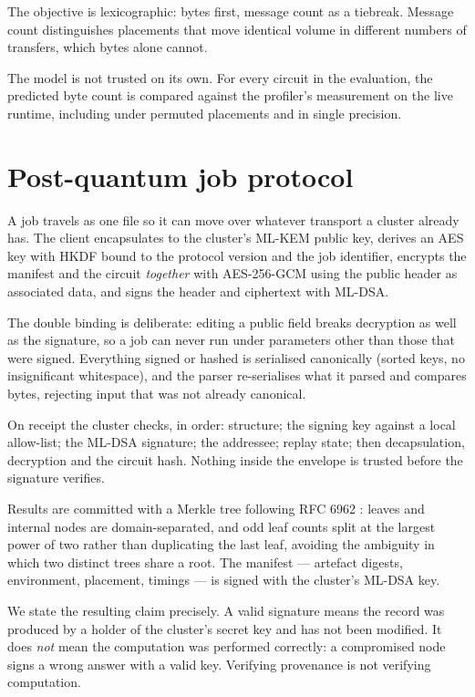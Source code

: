 \documentclass[11pt]{article}
\begin{document}
The objective is lexicographic: bytes first, message count as a tiebreak.
Message count distinguishes placements that move identical volume in different
numbers of transfers, which bytes alone cannot.

The model is not trusted on its own. For every circuit in the evaluation, the
predicted byte count is compared against the profiler's measurement on the live
runtime, including under permuted placements and in single precision.

\section{Post-quantum job protocol}

A job travels as one file so it can move over whatever transport a cluster
already has. The client encapsulates to the cluster's ML-KEM public key,
derives an AES key with HKDF bound to the protocol version and the job
identifier, encrypts the manifest and the circuit \emph{together} with
AES-256-GCM using the public header as associated data, and signs the header
and ciphertext with ML-DSA.

The double binding is deliberate: editing a public field breaks decryption as
well as the signature, so a job can never run under parameters other than those
that were signed. Everything signed or hashed is serialised canonically
(sorted keys, no insignificant whitespace), and the parser re-serialises what it
parsed and compares bytes, rejecting input that was not already canonical.

On receipt the cluster checks, in order: structure; the signing key against a
local allow-list; the ML-DSA signature; the addressee; replay state; then
decapsulation, decryption and the circuit hash. Nothing inside the envelope is
trusted before the signature verifies.

Results are committed with a Merkle tree following RFC 6962 \cite{rfc6962}:
leaves and internal nodes are domain-separated, and odd leaf counts split at the
largest power of two rather than duplicating the last leaf, avoiding the
ambiguity in which two distinct trees share a root. The manifest --- artefact
digests, environment, placement, timings --- is signed with the cluster's
ML-DSA key.

We state the resulting claim precisely. A valid signature means the record was
produced by a holder of the cluster's secret key and has not been modified. It
does \emph{not} mean the computation was performed correctly: a compromised
node signs a wrong answer with a valid key. Verifying provenance is not
verifying computation.
\end{document}
